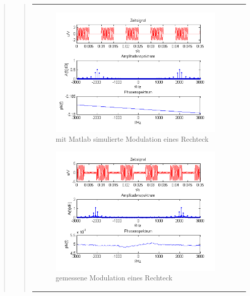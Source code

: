 \begin{quote}
\begin{quote}
\begin{center}
\begin{tabular}{ll}
\begin{minipage}{0.67\textwidth}
                \begin{figure}[H]
                    \label{fig:Morechtecksimu}
                    \includegraphics[scale=0.7]{Bilder/Am_Rec_2k_100Hz_mo_simu}
                    \caption{mit Matlab simulierte Modulation eines Rechteck}
                \end{figure}
        
            \end{minipage}
    
            \begin{minipage}{0.67\textwidth}
                \begin{figure}[H]
                    \label{fig:Morechteck}
                    \includegraphics[scale=0.7]{Bilder/Am_Rec_2k_100Hz_mo}
                    \caption{gemessene Modulation eines Rechteck}
                \end{figure}
        

\end{minipage}
\end{tabular}
\end{center}
\end{quote}
\end{quote}
